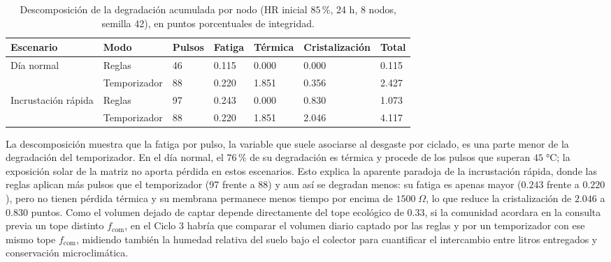 \begin{table}[htbp]
\centering
\small
\caption{Descomposici\'on de la degradaci\'on acumulada por nodo (HR inicial $85\,\%$, 24 h, 8 nodos, semilla 42), en puntos porcentuales de integridad.}
\label{tab:descomposicion}
\begin{tabularx}{\textwidth}{@{}Y L{2.4cm}R{1.3cm}R{1.3cm}R{1.5cm}R{2.4cm}R{1.3cm}@{}}
\toprule
\textbf{Escenario} & \textbf{Modo} & \textbf{Pulsos} & \textbf{Fatiga} & \textbf{T\'ermica} & \textbf{Cristalizaci\'on} & \textbf{Total} \\
\midrule
D\'ia normal & Reglas & 46 & 0.115 & 0.000 & 0.000 & 0.115 \\
             & Temporizador & 88 & 0.220 & 1.851 & 0.356 & 2.427 \\
\midrule
Incrustaci\'on r\'apida & Reglas & 97 & 0.243 & 0.000 & 0.830 & 1.073 \\
                        & Temporizador & 88 & 0.220 & 1.851 & 2.046 & 4.117 \\
\bottomrule
\end{tabularx}
\end{table}

La descomposici\'on muestra que la fatiga por pulso, la variable que suele asociarse al desgaste por ciclado, es una parte menor de la degradaci\'on del temporizador. En el d\'ia normal, el $76\,\%$ de su degradaci\'on es t\'ermica y procede de los pulsos que superan $45\;\si{\celsius}$; la exposici\'on solar de la matriz no aporta p\'erdida en estos escenarios. Esto explica la aparente paradoja de la incrustaci\'on r\'apida, donde las reglas aplican m\'as pulsos que el temporizador (97 frente a 88) y aun as\'i se degradan menos: su fatiga es apenas mayor ($0.243$ frente a $0.220$), pero no tienen p\'erdida t\'ermica y su membrana permanece menos tiempo por encima de $1500\;\Omega$, lo que reduce la cristalizaci\'on de $2.046$ a $0.830$ puntos. Como el volumen dejado de captar depende directamente del tope ecol\'ogico de $0.33$, si la comunidad acordara en la consulta previa un tope distinto $f_{\text{com}}$, en el Ciclo 3 habr\'ia que comparar el volumen diario captado por las reglas y por un temporizador con ese mismo tope $f_{\text{com}}$, midiendo tambi\'en la humedad relativa del suelo bajo el colector para cuantificar el intercambio entre litros entregados y conservaci\'on microclim\'atica.

